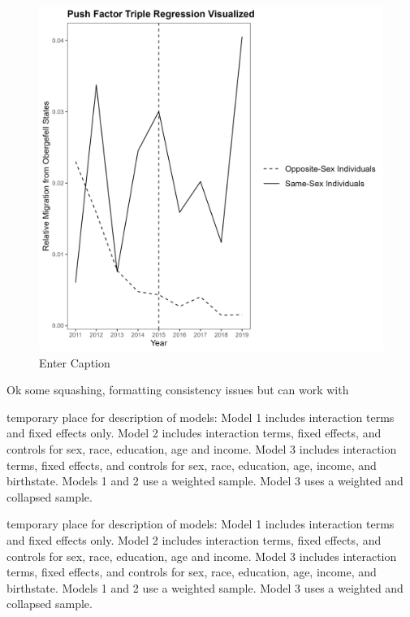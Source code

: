 \documentclass[]{article}
\begin{document}
\begin{figure}
    \centering
    \includegraphics[width=1\linewidth]{outputs/summary_stats/ante_diffs.png}
    \caption{Enter Caption}
    \label{fig:enter-label}
\end{figure}
Ok some squashing, formatting consistency issues but can work with


\clearpage



temporary place for description of models:
Model 1 includes interaction terms and fixed effects only. Model 2 includes interaction terms, fixed effects, and controls for sex, race, education, age and income. Model 3 includes interaction terms, fixed effects, and controls for sex, race, education, age, income, and birthstate. Models 1 and 2 use a weighted sample. Model 3 uses a weighted and collapsed sample.

\clearpage


temporary place for description of models:
Model 1 includes interaction terms and fixed effects only. Model 2 includes interaction terms, fixed effects, and controls for sex, race, education, age and income. Model 3 includes interaction terms, fixed effects, and controls for sex, race, education, age, income, and birthstate. Models 1 and 2 use a weighted sample. Model 3 uses a weighted and collapsed sample.
\clearpage
\hspace{-4cm}


\hspace{-4cm}


\clearpage

\begin{landscape}
\small

\end{landscape}

\clearpage
\begin{landscape}

\end{landscape}
\end{document}
